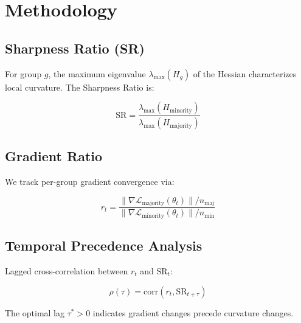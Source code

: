 \section{Methodology}

\subsection{Sharpness Ratio (SR)}

For group $g$, the maximum eigenvalue $\lambda_{\max}(H_g)$ of the Hessian characterizes local curvature. The Sharpness Ratio is:

\begin{equation}
\text{SR} = \frac{\lambda_{\max}(H_{\text{minority}})}{\lambda_{\max}(H_{\text{majority}})}
\end{equation}

\subsection{Gradient Ratio}

We track per-group gradient convergence via:

\begin{equation}
r_t = \frac{\|\nabla \mathcal{L}_{\text{majority}}(\theta_t)\| / n_{\text{maj}}}{\|\nabla \mathcal{L}_{\text{minority}}(\theta_t)\| / n_{\text{min}}}
\end{equation}

\subsection{Temporal Precedence Analysis}

Lagged cross-correlation between $r_t$ and $\text{SR}_t$:

\begin{equation}
\rho(\tau) = \text{corr}(r_{t}, \text{SR}_{t+\tau})
\end{equation}

The optimal lag $\tau^* > 0$ indicates gradient changes precede curvature changes.
